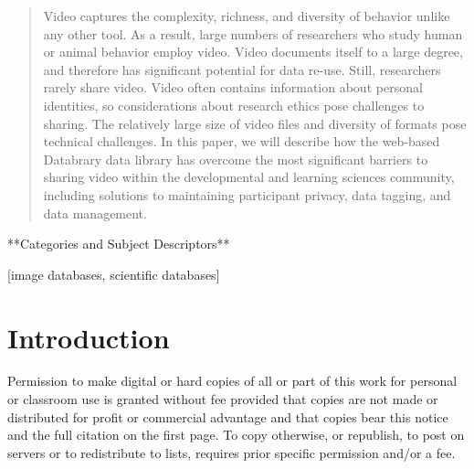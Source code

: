\documentclass{sig-alternate}
\begin{document}
\maketitle

\begin{abstract}

Video captures the complexity, richness, and diversity of behavior
unlike any other tool. As a result, large numbers of researchers who
study human or animal behavior employ video. Video documents itself to a
large degree, and therefore has significant potential for data re-use.
Still, researchers rarely share video. Video often contains information
about personal identities, so considerations about research ethics pose
challenges to sharing. The relatively large size of video files and
diversity of formats pose technical challenges. In this paper, we will
describe how the web-based Databrary data library has overcome the most
significant barriers to sharing video within the developmental and
learning sciences community, including solutions to maintaining
participant privacy, data tagging, and data management.
\end{abstract}

**Categories and Subject Descriptors**

[image
databases, scientific databases]



\section{Introduction}

Permission to make digital or hard copies of all or part of this work
for personal or classroom use is granted without fee provided that
copies are not made or distributed for profit or commercial advantage
and that copies bear this notice and the full citation on the first
page. To copy otherwise, or republish, to post on servers or to
redistribute to lists, requires prior specific permission and/or a fee.
\end{document}
